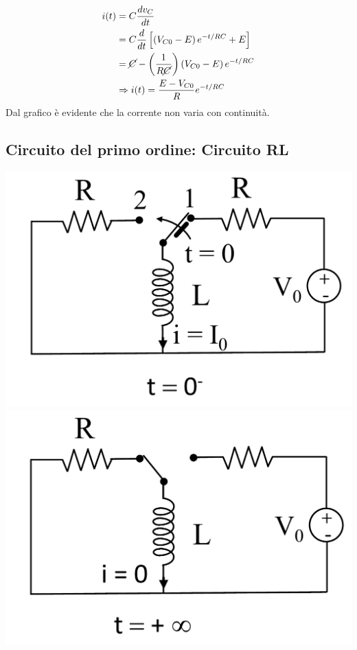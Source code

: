 \documentclass{article}
\begin{document}
\begin{align*}
    i(t) &= C \frac{dv_C}{dt}\\ 
    &= C \frac{d}{dt} \left[ \left(V_{C0}-E\right) e^{-t/RC}+E \right]\\
    &= \cancel{C} -\left(\frac{1}{R \cancel{C}}\right) \left(V_{C0}-E\right)e^{-t/RC}\\
    &\Rightarrow i(t) = \frac{E-V_{C0}}{R} e^{-t/RC}
\end{align*}
Dal grafico è evidente che la corrente non varia con continuità.


\subsection{Circuito del primo ordine: Circuito RL}
\begin{center}
    \includegraphics[scale=0.18]{Image/RL_0.png}
    \includegraphics[scale=0.18]{Image/RL_1.png}
\end{center}
\end{document}
